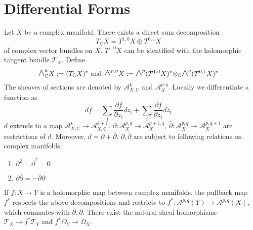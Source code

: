 \documentclass[12pt]{article}
\theoremstyle{plain}
\theoremstyle{definition}
\newcommand{\IC}{\mathbb{C}}
\newcommand\tensor{{\otimes}}
\newcommand{\<}{\langle}
\renewcommand{\>}{\rangle}
\newcommand{\p}{\partial}
\newcommand{\Ohm}{\Omega}
\newcommand{\bz}{\overline{z}}
\newcommand{\bp}{\overline{\p}}
\newcommand{\sT}{\mathcal{T}}
\newcommand{\sA}{\mathcal{A}}
\newcommand{\bwedge}{\mbox{\Large $\wedge$}}
\begin{document}
\section{Differential Forms}
Let $X$ be a complex manifold. There exists a direct sum decomposition 
$$ T_\IC X = T^{1, 0} X \oplus T^{0, 1} X $$
of complex vector bundles on $X$. $T^{1, 0}X$ can be identified with the holomorphic tangent bundle $\sT_X$. 
Define 
$$ \bwedge^{k}_\IC X := (T_\IC X)^* \text{ and } \bwedge^{p, q} X:= \bwedge^{p} (T^{1,0} X)^* \tensor_\IC \bwedge^q (T^{0, 1} X)^* $$
The sheaves of sections are denoted by $\sA^k_{X, \IC}$ and $\sA^{p, q}_{X}$. 
Locally we differentiate a function as 
$$ df = \sum_{i} \frac{\p f}{\p z_i} dz_i + \sum_{i} \frac{\p f}{\p \bz_i} d\bz_i $$
$d$ extends to a map $\sA_{X, \IC}^k \to \sA_{X, \IC}^{k + 1}$. $\p : \sA_X^{p, q} \to \sA_X^{p + 1, q}$, $\bp : \sA_X^{p, q} \to \sA_X^{p, q + 1}$ are restrictions of $d$. Moreover, $d = \p + \bp$. $\p, \bp$ are subject to following relations on complex manifolds:
\begin{enumerate}
\item $\p^2 = \bp^2 = 0 $
\item $\p \bp = - \bp \p$
\end{enumerate} 
If $f : X \to Y$ is a holomorphic map between complex manifolds, the pullback map $f^*$ respects the above decompositions and restricts to $f^* : \sA^{p, q}(Y) \to \sA^{p, q}(X)$, which commutes with $\p, \bp$. There exist the natural sheaf homorphisms $\sT_X \to f^* \sT_Y$ and $f^* \Ohm_Y \to \Ohm_X$.
\end{document}
